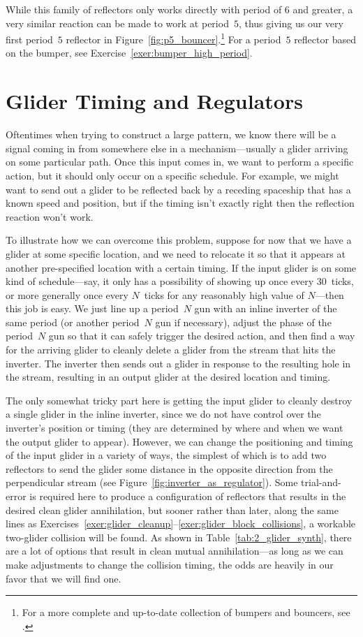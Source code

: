 While this family of reflectors only works directly with period of $6$ and greater, a very similar reaction can be made to work at period~$5$, thus giving us our very first period~$5$ reflector in Figure~\ref{fig:p5_bouncer}.\footnote{For a more complete and up-to-date collection of bumpers and bouncers, see .} For a period~$5$ reflector based on the bumper, see Exercise~\ref{exer:bumper_high_period}.


\section{Glider Timing and Regulators}\label{sec:periodic_regulators}

Oftentimes when trying to construct a large pattern, we know there will be a signal coming in from somewhere else in a mechanism---usually a glider arriving on some particular path. Once this input comes in, we want to perform a specific action, but it should only occur on a specific schedule. For example, we might want to send out a glider to be reflected back by a receding spaceship that has a known speed and position, but if the timing isn't exactly right then the reflection reaction won't work.

To illustrate how we can overcome this problem, suppose for now that we have a glider at some specific location, and we need to relocate it so that it appears at another pre-specified location with a certain timing. If the input glider is on some kind of schedule---say, it only has a possibility of showing up once every $30$~ticks, or more generally once every $N$~ticks for any reasonably high value of $N$---then this job is easy. We just line up a period~$N$ gun with an inline inverter of the same period (or another period~$N$ gun if necessary), adjust the phase of the period~$N$ gun so that it can safely trigger the desired action, and then find a way for the arriving glider to cleanly delete a glider from the stream that hits the inverter. The inverter then sends out a glider in response to the resulting hole in the stream, resulting in an output glider at the desired location and timing.

The only somewhat tricky part here is getting the input glider to cleanly destroy a single glider in the inline inverter, since we do not have control over the inverter's position or timing (they are determined by where and when we want the output glider to appear). However, we can change the positioning and timing of the input glider in a variety of ways, the simplest of which is to add two reflectors to send the glider some distance in the opposite direction from the perpendicular stream (see Figure~\ref{fig:inverter_as_regulator}). Some trial-and-error is required here to produce a configuration of reflectors that results in the desired clean glider annihilation, but sooner rather than later, along the same lines as Exercises~\ref{exer:glider_cleanup}--\ref{exer:glider_block_collisions}, a workable two-glider collision will be found. As shown in Table~\ref{tab:2_glider_synth}, there are a lot of options that result in clean mutual annihilation---as long as we can make adjustments to change the collision timing, the odds are heavily in our favor that we will find one.


